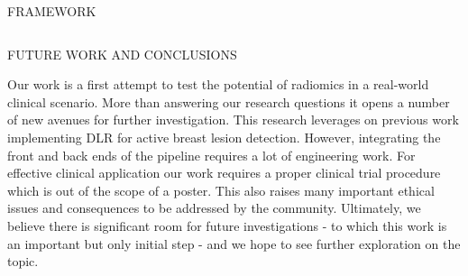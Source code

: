 \documentclass[final]{beamer}
\begin{document}
\begin{frame}[t, fragile = singleslide]{}
\begin{columns}[t]
\begin{column}{0.945\textwidth}
\begin{block}{FRAMEWORK}
\end{block}

\end{column}

\end{columns}

\begin{columns}[t]

\begin{column}{0.45\textwidth}

\begin{block}{FUTURE WORK AND CONCLUSIONS}

Our work is a first attempt to test the potential of radiomics in a real-world clinical scenario. More than answering our research questions it opens a number of new avenues for further investigation. This research leverages on previous work implementing DLR for active breast lesion detection. However, integrating the front and back ends of the pipeline requires a lot of engineering work. For effective clinical application our work requires a proper clinical trial procedure which is out of the scope of a poster. This also raises many important ethical issues and consequences to be addressed by the community. Ultimately, we believe there is significant room for future investigations - to which this work is an important but only initial step - and we hope to see further exploration on the topic.

\end{block}


\end{column}
\end{columns}
\end{frame}
\end{document}
